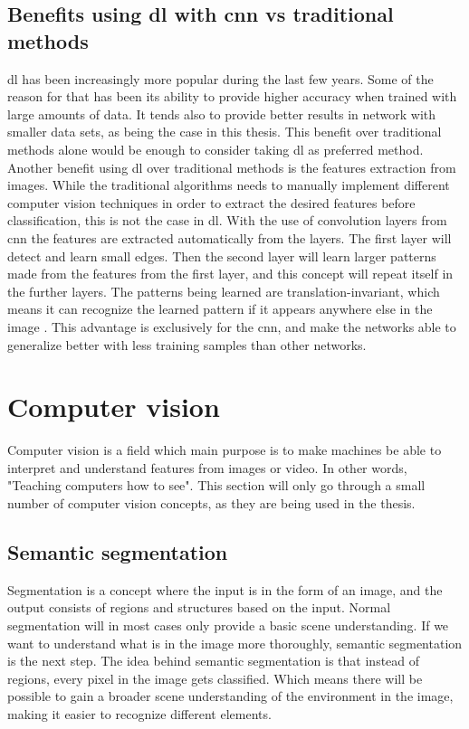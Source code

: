\documentclass[USenglish]{ifimaster}  %
\begin{document}
\subsection{Benefits using \ac{dl} with \ac{cnn} vs traditional methods}
\ac{dl} has been increasingly more popular during the last few years. Some of the reason for that has been its ability to provide higher accuracy when trained with large amounts of data. It tends also to provide better results in network with smaller data sets, as being the case in this thesis. This benefit over traditional methods alone would be enough to consider taking \ac{dl} as preferred method.
\newline
\newline
Another benefit using \ac{dl} over traditional methods is the features extraction from images. While the traditional algorithms needs to manually implement different computer vision techniques in order to extract the desired features before classification, this is not the case in \ac{dl}. With the use of convolution layers from \ac{cnn} the features are extracted automatically from the layers.
The first layer will detect and learn small edges. Then the second layer will learn larger patterns made from the features from the first layer, and this concept will repeat itself in the further layers. The patterns being learned are translation-invariant, which means it can recognize the learned pattern if it appears anywhere else in the image \cite{Francois_Deep_learning_with_python}. This advantage is exclusively for the \ac{cnn}, and make the networks able to generalize better with less training samples than other networks.

\section{Computer vision}
Computer vision is a field which main purpose is to make machines be able to interpret and understand features from images or video. In other words, "Teaching computers how to see"\cite{website:maskinsyn-intro}. This section will only go through a small number of computer vision concepts, as they are being used in the thesis.
\subsection{Semantic segmentation}
Segmentation is a concept where the input is in the form of an image, and the output consists of regions and structures based on the input. Normal segmentation will in most cases only provide a basic scene understanding. If we want to understand what is in the image more thoroughly, semantic segmentation is the next step. The idea behind semantic segmentation is that instead of regions, every pixel in the image gets classified. Which means there will be possible to gain a broader scene understanding of the environment in the image, making it easier to recognize different elements.
\end{document}
